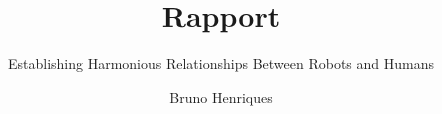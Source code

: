 \documentclass{sig-alternate}
\begin{document}













\title{Rapport}
\subtitle{Establishing Harmonious Relationships Between Robots and Humans}


\author{
\alignauthor Bruno Henriques \\
       \\
       \\
}
\end{document}
